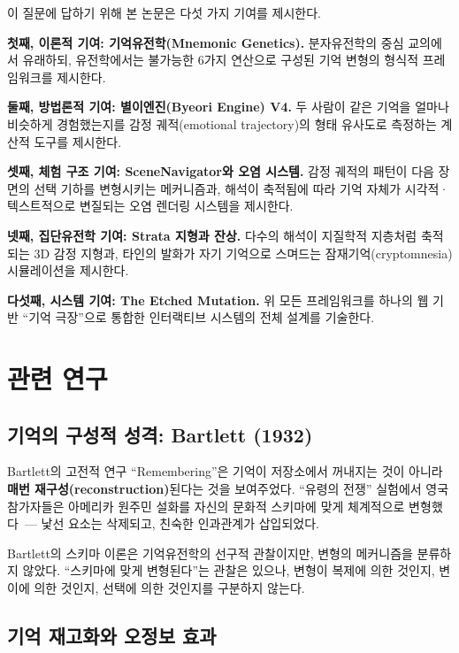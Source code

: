 \documentclass[11pt, a4paper]{article}
\begin{document}
이 질문에 답하기 위해 본 논문은 다섯 가지 기여를 제시한다.

\textbf{첫째, 이론적 기여: 기억유전학(Mnemonic Genetics).} 분자유전학의 중심 교의에서 유래하되, 유전학에서는 불가능한 6가지 연산으로 구성된 기억 변형의 형식적 프레임워크를 제시한다.

\textbf{둘째, 방법론적 기여: 별이엔진(Byeori Engine) V4.} 두 사람이 같은 기억을 얼마나 비슷하게 경험했는지를 감정 궤적(emotional trajectory)의 형태 유사도로 측정하는 계산적 도구를 제시한다.

\textbf{셋째, 체험 구조 기여: SceneNavigator와 오염 시스템.} 감정 궤적의 패턴이 다음 장면의 선택 기하를 변형시키는 메커니즘과, 해석이 축적됨에 따라 기억 자체가 시각적·텍스트적으로 변질되는 오염 렌더링 시스템을 제시한다.

\textbf{넷째, 집단유전학 기여: Strata 지형과 잔상.} 다수의 해석이 지질학적 지층처럼 축적되는 3D 감정 지형과, 타인의 발화가 자기 기억으로 스며드는 잠재기억(cryptomnesia) 시뮬레이션을 제시한다.

\textbf{다섯째, 시스템 기여: The Etched Mutation.} 위 모든 프레임워크를 하나의 웹 기반 ``기억 극장''으로 통합한 인터랙티브 시스템의 전체 설계를 기술한다.


\section{관련 연구}

\subsection{기억의 구성적 성격: Bartlett (1932)}

Bartlett의 고전적 연구 ``Remembering''은 기억이 저장소에서 꺼내지는 것이 아니라 \textbf{매번 재구성(reconstruction)}된다는 것을 보여주었다\cite{bartlett1932}. ``유령의 전쟁'' 실험에서 영국 참가자들은 아메리카 원주민 설화를 자신의 문화적 스키마에 맞게 체계적으로 변형했다~--- 낯선 요소는 삭제되고, 친숙한 인과관계가 삽입되었다.

Bartlett의 스키마 이론은 기억유전학의 선구적 관찰이지만, 변형의 메커니즘을 분류하지 않았다. ``스키마에 맞게 변형된다''는 관찰은 있으나, 변형이 복제에 의한 것인지, 변이에 의한 것인지, 선택에 의한 것인지를 구분하지 않는다.

\subsection{기억 재고화와 오정보 효과}
\end{document}
